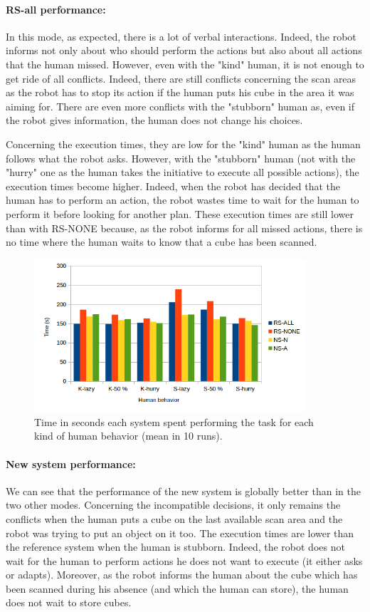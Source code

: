 \documentclass[english,a4paper,11pt,twoside]{StyleThese}
\begin{document}
\paragraph{RS-all performance:}
In this mode, as expected, there is a lot of verbal interactions. Indeed, the robot informs not only about who should perform the actions but also about all actions that the human missed. However, even with the "kind" human, it is not enough to get ride of all conflicts. Indeed, there are still conflicts concerning the scan areas as the robot has to stop its action if the human puts his cube in the area it was aiming for. There are even more conflicts with the "stubborn" human as, even if the robot gives information, the human does not change his choices.

Concerning the execution times, they are low for the "kind" human as the human follows what the robot asks. However, with the "stubborn" human (not with the "hurry" one as the human takes the initiative to execute all possible actions), the execution times become higher. Indeed, when the robot has decided that the human has to perform an action, the robot wastes time to wait for the human to perform it before looking for another plan. These execution times are still lower than with RS-NONE because, as the robot informs for all missed actions, there is no time where the human waits to know that a cube has been scanned.

\begin{figure}[!h]
	\centering
    \includegraphics[width=0.9\textwidth]{figs/Chapter5/Time.png}
    \caption{Time in seconds each system spent performing the task for each kind of human behavior (mean in 10 runs).}
    \label{fig:resTime}
\end{figure}


\paragraph{New system performance:}
We can see that the performance of the new system is globally better than in the two other modes. Concerning the incompatible decisions, it only remains the conflicts when the human puts a cube on the last available scan area and the robot was trying to put an object on it too. The execution times are lower than the reference system when the human is stubborn. Indeed, the robot does not wait for the human to perform actions he does not want to execute (it either asks or adapts). Moreover, as the robot informs the human about the cube which has been scanned during his absence (and which the human can store), the human does not wait to store cubes.
\end{document}
